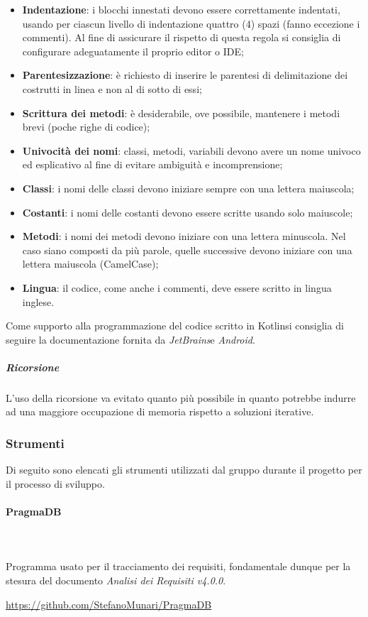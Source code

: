 			\begin{itemize}
				\item \textbf{Indentazione}: i blocchi innestati devono essere correttamente indentati, usando per ciascun livello di indentazione quattro (4) spazi (fanno eccezione i commenti). Al fine di assicurare il rispetto di questa regola si consiglia di configurare adeguatamente il proprio editor o IDE;
				\item \textbf{Parentesizzazione}: è richiesto di inserire le parentesi di delimitazione dei costrutti in linea e non al di sotto di essi;
				\item \textbf{Scrittura dei metodi}: è desiderabile, ove possibile, mantenere i metodi brevi (poche righe di codice);
				\item \textbf{Univocità dei nomi}: classi, metodi, variabili devono avere un nome univoco	 ed esplicativo al fine di evitare ambiguità e incomprensione;
				\item \textbf{Classi}: i nomi delle classi devono iniziare sempre con una lettera maiuscola;
				\item \textbf{Costanti}: i nomi delle costanti devono essere scritte usando solo maiuscole;
				\item \textbf{Metodi}: i nomi dei metodi devono iniziare con una lettera minuscola. Nel caso
				siano composti da più parole, quelle successive devono iniziare con una lettera maiuscola (CamelCase\glo{});
				\item \textbf{Lingua}: il codice, come anche i commenti, deve essere scritto in lingua inglese.
			\end{itemize}
			Come supporto alla programmazione del codice scritto in Kotlin\glosp si consiglia di seguire la documentazione fornita da \textit{JetBrains}\glosp e \textit{Android}\glo. \newline \newline
			\subparagraph{Ricorsione}
			L'uso della ricorsione va evitato quanto più possibile in  quanto  potrebbe
			indurre  ad  una  maggiore  occupazione  di  memoria  rispetto  a  soluzioni
			iterative.
			
	\subsubsection{Strumenti}
	Di seguito sono elencati gli strumenti utilizzati dal gruppo durante il progetto per il processo di sviluppo.	
		\paragraph{PragmaDB} \mbox{}\\ \mbox{}\\
		Programma usato per il tracciamento dei requisiti, fondamentale dunque per la stesura del documento \textit{Analisi dei Requisiti v4.0.0}. \newline
		\centerline{\url{https://github.com/StefanoMunari/PragmaDB}}
